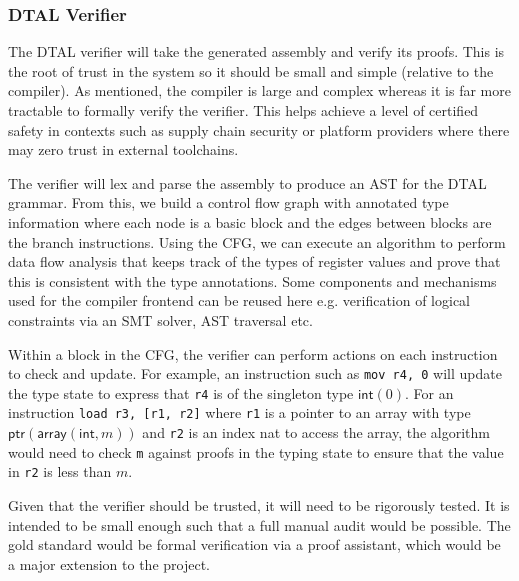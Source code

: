 \documentclass[a4paper, 12pt]{article}
\begin{document}
\subsubsection*{DTAL Verifier}

The DTAL verifier will take the generated assembly and verify its proofs. This is the root of trust in the system so it should be small and simple (relative to the compiler). As mentioned, the compiler is large and complex whereas it is far more tractable to formally verify the verifier. This helps achieve a level of certified safety in contexts such as supply chain security or platform providers where there may zero trust in external toolchains.

The verifier will lex and parse the assembly to produce an AST for the DTAL grammar. From this, we build a control flow graph with annotated type information where each node is a basic block and the edges between blocks are the branch instructions. Using the CFG, we can execute an algorithm to perform data flow analysis that keeps track of the types of register values and prove that this is consistent with the type annotations. Some components and mechanisms used for the compiler frontend can be reused here e.g. verification of logical constraints via an SMT solver, AST traversal etc.

Within a block in the CFG, the verifier can perform actions on each instruction to check and update. For example, an instruction such as \texttt{mov r4, 0} will update the type state to express that \texttt{r4} is of the singleton type $\textsf{int}(0)$. For an instruction \texttt{load r3, [r1, r2]} where \texttt{r1} is a pointer to an array with type $\textsf{ptr}(\textsf{array}(\textsf{int}, m))$ and \texttt{r2} is an index \textsf{nat} to access the array, the algorithm would need to check \texttt{m} against proofs in the typing state to ensure that the value in \texttt{r2} is less than $m$.

Given that the verifier should be trusted, it will need to be rigorously tested. It is intended to be small enough such that a full manual audit would be possible. The gold standard would be formal verification via a proof assistant, which would be a major extension to the project.
\end{document}
